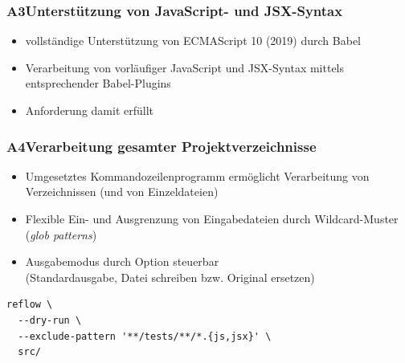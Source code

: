       \begin{frame}
        \frametitle{A3\hspace{0.75em}Unterstützung von JavaScript- und JSX-Syntax}
        \begin{itemize}
          \item vollständige Unterstützung von ECMAScript 10 (2019) durch Babel
          \item Verarbeitung von vorläufiger JavaScript und JSX-Syntax mittels entsprechender Babel-Plugins
          \item Anforderung damit erfüllt
        \end{itemize}
      \end{frame}

      \begin{frame}[fragile]
        \frametitle{A4\hspace{0.75em}Verarbeitung gesamter Projektverzeichnisse}
        \begin{itemize}
          \item Umgesetztes Kommandozeilenprogramm ermöglicht Verarbeitung von Verzeichnissen (und von Einzeldateien)
          \item Flexible Ein- und Ausgrenzung von Eingabedateien durch Wildcard-Muster (\textit{glob patterns})
          \item Ausgabemodus durch Option steuerbar\\(Standardausgabe, Datei schreiben bzw. Original ersetzen)
        \end{itemize}

        \bigskip
        \begin{lstlisting}[numbers=none]
reflow \
  --dry-run \
  --exclude-pattern '**/tests/**/*.{js,jsx}' \
  src/
        \end{lstlisting}
      \end{frame}

